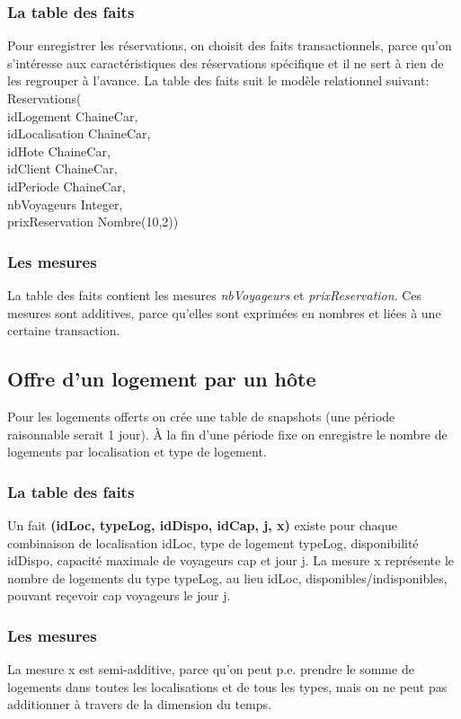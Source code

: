 \documentclass[11pt]{article}
\begin{document}
\subsubsection*{La table des faits}
Pour enregistrer les réservations, on choisit des faits transactionnels, parce qu'on s'intéresse aux caractéristiques des réservations spécifique et il ne sert à rien de les regrouper à l'avance. La table des faits suit le modèle relationnel suivant:\\
Reservations(\\
idLogement ChaineCar,\\
idLocalisation ChaineCar,\\
idHote ChaineCar,\\
idClient ChaineCar,\\
idPeriode ChaineCar,\\
nbVoyageurs Integer,\\
prixReservation Nombre(10,2))
\subsubsection*{Les mesures}
La table des faits contient les mesures \textit{nbVoyageurs} et \textit{prixReservation}. Ces mesures sont additives, parce qu'elles sont exprimées en nombres et liées à une certaine transaction. 
\subsection{Offre d'un logement par un hôte}
Pour les logements offerts on crée une table de snapshots (une période raisonnable serait 1 jour). À la fin d'une période fixe on enregistre le nombre de logements par localisation et type de logement.
\subsubsection*{La table des faits}
Un fait \textbf{(idLoc, typeLog, idDispo, idCap, j, x)} existe pour chaque combinaison de localisation idLoc, type de logement typeLog, disponibilité idDispo, capacité maximale de voyageurs cap et jour j. La mesure x représente le nombre de logements du type typeLog, au lieu idLoc, disponibles/indisponibles, pouvant reçevoir cap voyageurs le jour j.
\subsubsection*{Les mesures}
La mesure x est semi-additive, parce qu'on peut p.e. prendre le somme de logements dans toutes les localisations et de tous les types, mais on ne peut pas additionner à travers de la dimension du temps.
\end{document}
